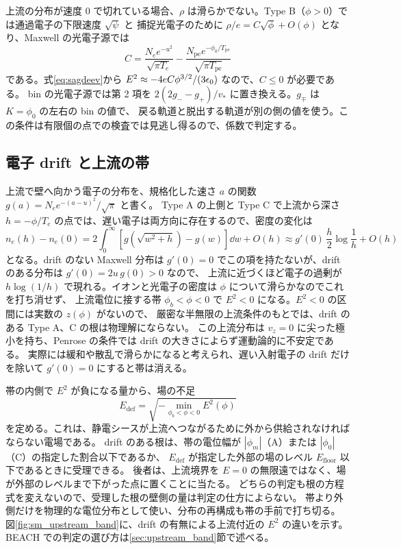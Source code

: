 上流の分布が速度 0 で切れている場合、$\rho$ は滑らかでない。Type B（$\phi>0$）では通過電子の下限速度 $\sqrt\psi$ と
捕捉光電子のために $\rho/e=C\sqrt\phi+O(\phi)$ となり、Maxwell の光電子源では
\begin{equation}
 C=\frac{N_ee^{-u^2}}{\sqrt{\pi T_e}}-\frac{N_{\mathrm{pe}}e^{-\phi_0/T_{\mathrm{pe}}}}{\sqrt{\pi T_{\mathrm{pe}}}}
 \label{eq:sm_b_coefficient}
\end{equation}
である。式\eqref{eq:sagdeev}から $E^2\approx-4eC\phi^{3/2}/(3\epsilon_0)$ なので、$C\le0$ が必要である。
bin の光電子源では第 2 項を $2(2g_-{-}g_+)/v_*$ に置き換える。$g_\mp$ は $K=\phi_0$ の左右の bin の値で、
戻る軌道と脱出する軌道が別の側の値を使う。この条件は有限個の点での検査では見逃し得るので、係数で判定する。

\subsection{電子 drift と上流の帯}
\label{sec:sm_band}
上流で壁へ向かう電子の分布を、規格化した速さ $a$ の関数 $g(a)=N_ee^{-(a-u)^2}/\sqrt\pi$ と書く。
Type A の上側と Type C で上流から深さ $h=-\phi/T_e$ の点では、遅い電子は両方向に存在するので、密度の変化は
\begin{equation}
 n_e(h)-n_e(0)=2\int_0^{\infty}\left[g\!\left(\sqrt{w^2+h}\right)-g(w)\right]\dd w+O(h)
 \approx g'(0)\,\frac h2\log\frac1h+O(h)
 \label{eq:hlogh}
\end{equation}
となる。drift のない Maxwell 分布は $g'(0)=0$ でこの項を持たないが、drift のある分布は $g'(0)=2u\,g(0)>0$ なので、
上流に近づくほど電子の過剰が $h\log(1/h)$ で現れる。イオンと光電子の密度は $\phi$ について滑らかなのでこれを打ち消せず、
上流電位に接する帯 $\phi_b<\phi<0$ で $E^2<0$ になる。$E^2<0$ の区間には実数の $z(\phi)$ がないので、
厳密な半無限の上流条件のもとでは、drift のある Type A、C の根は物理解にならない。
この上流分布は $v_z=0$ に尖った極小を持ち、Penrose の条件\citep{Penrose1960}では drift の大きさによらず運動論的に不安定である。
実際には緩和や散乱で滑らかになると考えられ、遅い入射電子の drift だけを除いて $g'(0)=0$ にすると帯は消える。

帯の内側で $E^2$ が負になる量から、場の不足
\begin{equation}
 E_{\mathrm{def}}=\sqrt{-\min_{\phi_b<\phi<0}E^2(\phi)}
 \label{eq:sm_deficit}
\end{equation}
を定める。これは、静電シースが上流へつながるために外から供給されなければならない電場である。
drift のある根は、帯の電位幅が $|\phi_m|$（A）または $|\phi_0|$（C）の指定した割合以下であるか、
$E_{\mathrm{def}}$ が指定した外部の場のレベル $E_{\mathrm{floor}}$ 以下であるときに受理できる。
後者は、上流境界を $E=0$ の無限遠ではなく、場が外部のレベルまで下がった点に置くことに当たる。
どちらの判定も根の方程式を変えないので、受理した根の壁側の量は判定の仕方によらない。
帯より外側だけを物理的な電位分布として使い、分布の再構成も帯の手前で打ち切る。
図\ref{fig:sm_upstream_band}に、drift の有無による上流付近の $E^2$ の違いを示す。BEACH での判定の選び方は\ref{sec:upstream_band}節で述べる。

